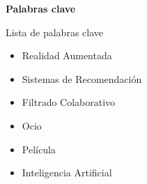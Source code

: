 \begin{center}

{\bf \Large Palabras clave}

   \end{center}

   \vspace{0.5cm}
   
   Lista de palabras clave
   \begin{itemize}  
    \item Realidad Aumentada
    \item Sistemas de Recomendación
    \item Filtrado Colaborativo
    \item Ocio
    \item Película
    \item Inteligencia Artificial
  \end{itemize}
   


